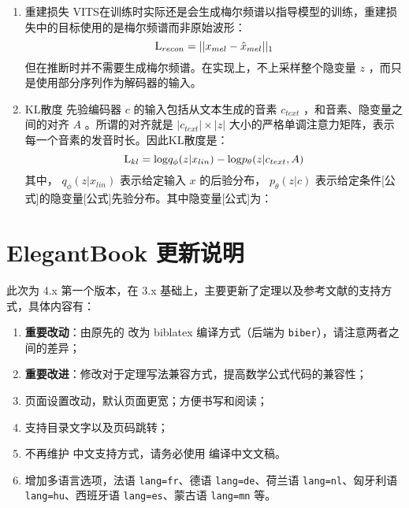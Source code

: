 \documentclass[cn,10pt,math=newtx,citestyle=gb7714-2015,bibstyle=gb7714-2015]{elegantbook}
\begin{document}
\begin{enumerate}
  \item 重建损失
  VITS在训练时实际还是会生成梅尔频谱以指导模型的训练，重建损失中的目标使用的是梅尔频谱而非原始波形：
  \begin{equation}
    {\rm L}_{recon}=||x_{mel}-\hat{x}_{mel}||_1
  \end{equation}
  但在推断时并不需要生成梅尔频谱。在实现上，不上采样整个隐变量 $z$ ，而只是使用部分序列作为解码器的输入。

  \item KL散度
  先验编码器 $c$ 的输入包括从文本生成的音素 $c_{text}$ ，和音素、隐变量之间的对齐 $A$ 。所谓的对齐就是 $|c_{text}|\times |z|$ 大小的严格单调注意力矩阵，表示每一个音素的发音时长。因此KL散度是：
  \begin{equation}
    {\rm L}_{kl}={\rm log}q_{\phi}(z|x_{lin})-{\rm log}p_\theta (z|c_{text},A)
  \end{equation}
  其中， $q_{\phi}(z|x_{lin})$ 表示给定输入 $x$ 的后验分布， $p_\theta(z|c)$ 表示给定条件[公式]的隐变量[公式]先验分布。其中隐变量[公式]为：
\end{enumerate}























\section{ElegantBook 更新说明}

此次为 4.x 第一个版本，在 3.x 基础上，主要更新了定理以及参考文献的支持方式，具体内容有：

\begin{enumerate}
  \item \textbf{重要改动}：由原先的  改为 biblatex 编译方式（后端为 \lstinline{biber}），请注意两者之间的差异；
  \item \textbf{重要改进}：修改对于定理写法兼容方式，提高数学公式代码的兼容性；
  \item 页面设置改动，默认页面更宽；方便书写和阅读；
  \item 支持目录文字以及页码跳转；
  \item 不再维护  中文支持方式，请务必使用  编译中文文稿。
  \item 增加多语言选项，法语 \lstinline{lang=fr}、德语 \lstinline{lang=de}、荷兰语 \lstinline{lang=nl}、匈牙利语 \lstinline{lang=hu}、西班牙语 \lstinline{lang=es}、蒙古语 \lstinline{lang=mn} 等。
\end{enumerate}
\end{document}
